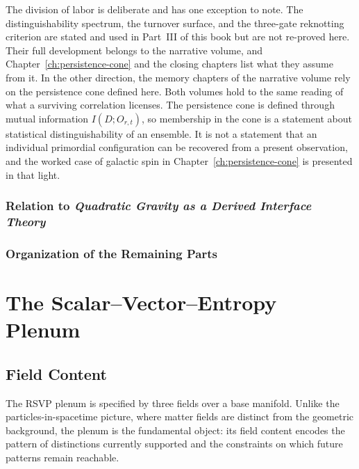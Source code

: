 \documentclass[12pt,a4paper,twoside,openright]{book}
\theoremstyle{plain}
\theoremstyle{definition}
\theoremstyle{remark}
\begin{document}
The division of labor is deliberate and has one exception to note. The distinguishability spectrum, the turnover surface, and the three-gate reknotting criterion are stated and used in Part~III of this book but are not re-proved here. Their full development belongs to the narrative volume, and Chapter~\ref{ch:persistence-cone} and the closing chapters list what they assume from it. In the other direction, the memory chapters of the narrative volume rely on the persistence cone defined here. Both volumes hold to the same reading of what a surviving correlation licenses. The persistence cone is defined through mutual information $I(D;O_{r,t})$, so membership in the cone is a statement about statistical distinguishability of an ensemble. It is not a statement that an individual primordial configuration can be recovered from a present observation, and the worked case of galactic spin in Chapter~\ref{ch:persistence-cone} is presented in that light.

\subsection{Relation to \emph{Quadratic Gravity as a Derived Interface Theory}}
\subsection{Organization of the Remaining Parts}


\chapter{The Scalar--Vector--Entropy Plenum}
\label{ch:plenum}

\section{Field Content}

The RSVP plenum is specified by three fields over a base manifold. Unlike the particles-in-spacetime picture, where matter fields are distinct from the geometric background, the plenum is the fundamental object: its field content encodes the pattern of distinctions currently supported and the constraints on which future patterns remain reachable.

\end{document}
